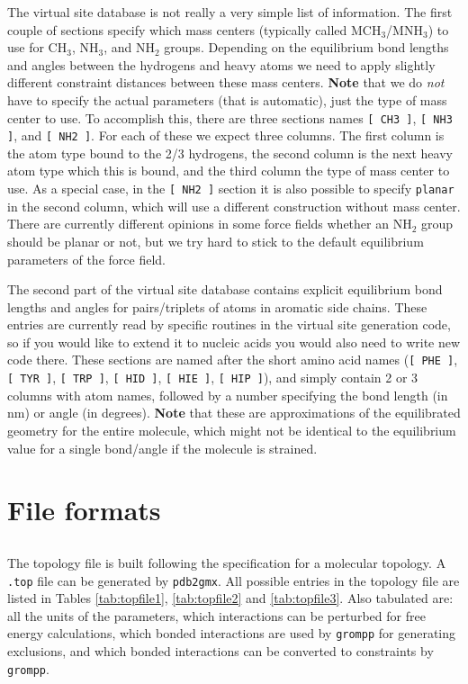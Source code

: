 The virtual site database is not really a very simple list of information. The first couple of sections
specify which mass centers (typically called MCH$_3$/MNH$_3$) to use for CH$_3$, NH$_3$, 
and NH$_2$ groups. Depending on the 
equilibrium bond lengths and angles between the hydrogens and heavy atoms we need to apply
slightly different constraint distances between these mass centers. {\bf Note} that we do {\em not} have to
specify the actual parameters (that is automatic), just the type of mass center to use. To accomplish this,
there are three sections names \verb+[ CH3 ]+, \verb+[ NH3 ]+, and \verb+[ NH2 ]+. For each of these we
expect three columns. The first column is the atom type bound to the 2/3 hydrogens, the second column
is the next heavy atom type which this is bound, and the third column the type of mass center to use.
As a special case, in the  \verb+[ NH2 ]+ section it is also possible to specify \verb+planar+ in the second
column, which will use a different construction without mass center. There are currently different opinions
in some force fields whether an NH$_2$ group should be planar or not, but we try hard to stick to the
default equilibrium parameters of the force field.

The second part of the virtual site database contains explicit equilibrium bond lengths and angles
for pairs/triplets of atoms in aromatic side chains. These entries are currently read by specific routines
in the virtual site generation code, so if you would like to extend it {\eg} to nucleic acids you would also
need to write new code there. These sections are named after the short amino acid names
(\verb+[ PHE ]+, \verb+[ TYR ]+, \verb+[ TRP ]+, \verb+[ HID ]+, \verb+[ HIE ]+, \verb+[ HIP ]+), and simply
contain 2 or 3 columns with atom names, followed by a number specifying the bond length (in nm) or angle
(in degrees). {\bf Note} that these are approximations of the equilibrated geometry for the entire molecule, 
which might not be identical to the equilibrium value for a single bond/angle if the molecule is strained.


\section{File formats}
\subsection{}
\label{subsec:topfile}
The topology file is built following the {\gromacs} specification for a
molecular topology.  A {\tt *.top} file can be generated by
{\tt pdb2gmx}.
All possible entries in the topology file are listed in
Tables \ref{tab:topfile1}, \ref{tab:topfile2}  and \ref{tab:topfile3}.
Also tabulated are: all the units
of the parameters, which interactions can be perturbed for free energy
calculations, which bonded interactions are used by {\tt grompp}
for generating exclusions, and which bonded interactions can be converted
to constraints by {\tt grompp}.


